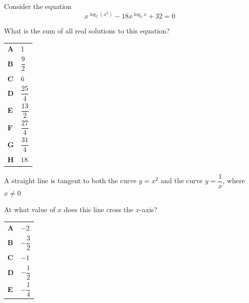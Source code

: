\documentclass[11pt,a4paper]{article}
\begin{document}
\begin{enumerate}[label=\textbf{\arabic*.},leftmargin=*,itemsep=0pt,start=6]
Consider the equation
\[
x^{\log_2(x^2)} - 18 x^{\log_2 x} + 32 = 0
\]

What is the sum of all real solutions to this equation?

\par\vspace*{12pt}
\begin{tabularx}{\linewidth}{@{}>{\bfseries}l Y@{}}
A &
$1$
\\[0.8em]
B &
$\dfrac{9}{2}$
\\[0.8em]
C &
$6$
\\[0.8em]
D &
$\dfrac{25}{4}$
\\[0.8em]
E &
$\dfrac{13}{2}$
\\[0.8em]
F &
$\dfrac{27}{4}$
\\[0.8em]
G &
$\dfrac{31}{4}$
\\[0.8em]
H &
$18$
\\
\end{tabularx}
\end{enumerate}
\clearpage
\thispagestyle{djspaper}
\vspace*{8pt}
\begin{enumerate}[label=\textbf{\arabic*.},leftmargin=*,itemsep=0pt,start=7]
\questionitem[Differentiation]
A straight line is tangent to both the curve $y=x^2$ and the curve $y=\dfrac{1}{x}$, where $x\ne0$

At what value of $x$ does this line cross the $x$-axis?

\par\vspace*{12pt}
\begin{tabularx}{\linewidth}{@{}>{\bfseries}l Y@{}}
A &
$-2$
\\[0.8em]
B &
$-\dfrac{3}{2}$
\\[0.8em]
C &
$-1$
\\[0.8em]
D &
$-\dfrac{1}{2}$
\\[0.8em]
E &
$-\dfrac{1}{4}$
\\
\end{tabularx}
\end{enumerate}
\end{document}
